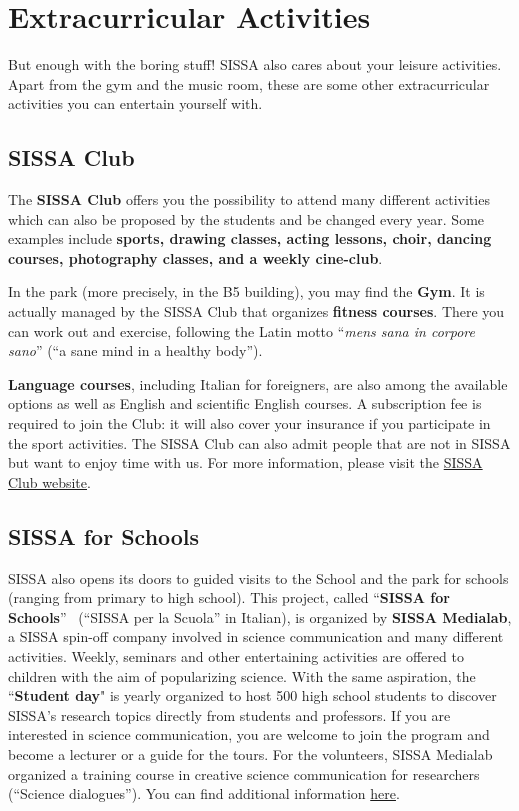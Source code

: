 \documentclass{sissavademecum}
\begin{document}
\chapter{Extracurricular Activities}

But enough with the boring stuff! SISSA also cares about your leisure activities. Apart from the gym and the music room, these are some other extracurricular activities you can entertain yourself with.


\section{SISSA Club}

The \textbf{SISSA Club} offers you the possibility to attend many different activities which can also be proposed by the students and be changed every year. Some examples include \textbf{sports, drawing classes, acting lessons, choir, dancing courses, photography classes, and a weekly cine-club}. 

In the park (more precisely, in the B5 building), you may find the \textbf{Gym}. It is actually managed by the SISSA Club that organizes \textbf{fitness courses}. There you can work out and exercise, following the Latin motto ``\textit{mens sana in corpore sano}{}'' (``a sane mind in a healthy body''). 

\textbf{Language courses}, including Italian for foreigners, are also among the available options as well as English and scientific English courses. A subscription fee is required to join the Club: it will also cover your insurance if you participate in the sport activities. The SISSA Club can also admit people that are not in SISSA but want to enjoy time with us. For more information, please visit the \href{http://club.sissa.it/}{SISSA Club website}. 


\section{SISSA for Schools}

SISSA also opens its doors to guided visits to the School and the park for schools (ranging from primary to high school). This project, called ``\textbf{SISSA for Schools}{}'' \ (``SISSA per la Scuola'' in Italian), is organized by \textbf{SISSA Medialab}, a SISSA spin-off company involved in science communication and many different activities. Weekly, seminars and other entertaining activities are offered to children with the aim of popularizing science. With the same aspiration, the ``\textbf{Student day}" is yearly organized to host 500 high school students to discover SISSA's research topics directly from students and professors. If you are interested in science communication, you are welcome to join the program and become a lecturer or a guide for the tours.  For the volunteers, SISSA Medialab organized a training course in creative science communication for researchers (``Science dialogues''). You can find additional information \href{http://medialab.sissa.it/sissaperlascuola/en}{here}.
\end{document}
